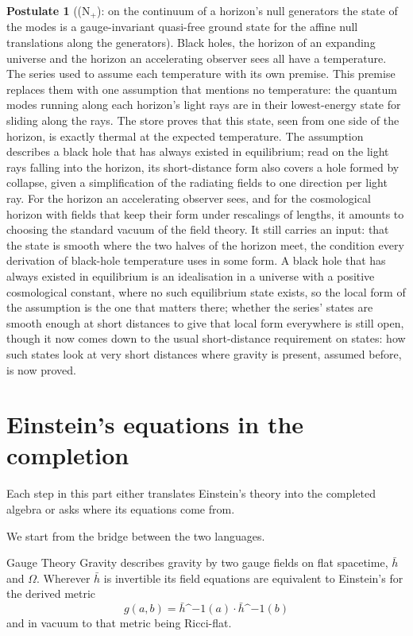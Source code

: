 \documentclass[11pt]{article}
\theoremstyle{definition}
\newtheorem{postulate}[theorem]{Postulate}
\theoremstyle{plain}
\providecommand{\hb}{}\renewcommand{\hb}{\bar{h}}
\begin{document}
\begin{postulate}[(N$_{+}$): on the continuum of a horizon's null generators the state of the modes is a gauge-invariant quasi-free ground state for the affine null translations along the generators]\label{c:synthesis.n-plus-null-ground-state}
Black holes, the horizon of an expanding universe and the horizon an accelerating observer sees all have a temperature. The series used to assume each temperature with its own premise. This premise replaces them with one assumption that mentions no temperature: the quantum modes running along each horizon's light rays are in their lowest-energy state for sliding along the rays. The store proves that this state, seen from one side of the horizon, is exactly thermal at the expected temperature. The assumption describes a black hole that has always existed in equilibrium; read on the light rays falling into the horizon, its short-distance form also covers a hole formed by collapse, given a simplification of the radiating fields to one direction per light ray. For the horizon an accelerating observer sees, and for the cosmological horizon with fields that keep their form under rescalings of lengths, it amounts to choosing the standard vacuum of the field theory. It still carries an input: that the state is smooth where the two halves of the horizon meet, the condition every derivation of black-hole temperature uses in some form. A black hole that has always existed in equilibrium is an idealisation in a universe with a positive cosmological constant, where no such equilibrium state exists, so the local form of the assumption is the one that matters there; whether the series' states are smooth enough at short distances to give that local form everywhere is still open, though it now comes down to the usual short-distance requirement on states: how such states look at very short distances where gravity is present, assumed before, is now proved.
\end{postulate}

\section{Einstein's equations in the completion}

Each step in this part either translates Einstein's theory into the completed algebra or asks where its equations come from.

We start from the bridge between the two languages.

Gauge Theory Gravity describes gravity by two gauge fields on flat spacetime, $\hb$ and $\Omega$. Wherever $\hb$ is invertible its field equations are equivalent to Einstein's for the derived metric \[ g(a,b) = \hb\^{}{-1}(a)\cdot\hb\^{}{-1}(b) \] and in vacuum to that metric being Ricci-flat.
\end{document}
